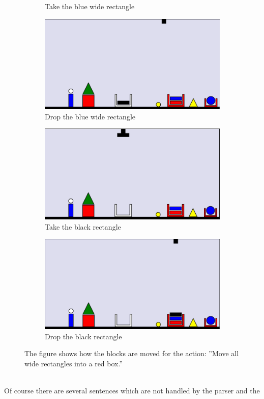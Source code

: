 \begin{figure}
\begin{subfigure}{.5\textwidth}
  \caption{Take the blue wide rectangle}
  \label{fig:8}
\end{subfigure}
\begin{subfigure}{.5\textwidth}
  \centering
  \includegraphics[width=.7\linewidth]{fig/9.png}
  \caption{Drop the blue wide rectangle}
  \label{fig:9}
\end{subfigure}%
\begin{subfigure}{.5\textwidth}
  \centering
  \includegraphics[width=.7\linewidth]{fig/10.png}
  \caption{Take the black rectangle}
  \label{fig:10}
\end{subfigure}
\begin{subfigure}{.5\textwidth}
  \centering
  \includegraphics[width=.7\linewidth]{fig/11.png}
  \caption{Drop the black rectangle}
  \label{fig:11}
\end{subfigure}
\caption{The figure shows how the blocks are moved for the action: ''Move all wide rectangles into a red 
box.''}
\label{fig:moveex}
\end{figure}\\
Of course there are several sentences which are not handled by the parser and the
